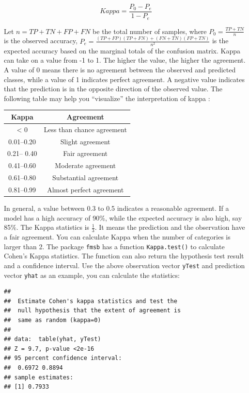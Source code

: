\documentclass[12pt,]{krantz}
\makeatletter
\newenvironment{Shaded}{\begin{snugshade}}{\end{snugshade}}
\newcommand{\CommentTok}[1]{\textcolor[rgb]{0.37,0.37,0.37}{\textit{#1}}}
\newcommand{\KeywordTok}[1]{\textcolor[rgb]{0.27,0.27,0.27}{\textbf{#1}}}
\newcommand{\NormalTok}[1]{#1}
\newcommand{\OperatorTok}[1]{\textcolor[rgb]{0.43,0.43,0.43}{\textbf{#1}}}
\newenvironment{kframe}{%
\medskip{}
\setlength{\fboxsep}{.8em}
 \def\at@end@of@kframe{}%
 \ifinner\ifhmode%
  \def\at@end@of@kframe{\end{minipage}}%
  \begin{minipage}{\columnwidth}%
 \fi\fi%
 \def\FrameCommand##1{\hskip\@totalleftmargin \hskip-\fboxsep
 \colorbox{shadecolor}{##1}\hskip-\fboxsep
     \hskip-\linewidth \hskip-\@totalleftmargin \hskip\columnwidth}%
 \MakeFramed {\advance\hsize-\width
   \@totalleftmargin\z@ \linewidth\hsize
   \@setminipage}}%
 {\par\unskip\endMakeFramed%
 \at@end@of@kframe}
\renewenvironment{Shaded}{\begin{kframe}}{\end{kframe}}
\makeatother
\begin{document}
\[Kappa=\frac{P_{0}-P_{e}}{1-P_{e}}\]

Let \(n=TP+TN+FP+FN\) be the total number of samples, where \(P_{0}=\frac{TP+TN}{n}\) is the observed accuracy, \(P_{e}=\frac{(TP+FP)(TP+FN)+(FN+TN)(FP+TN)}{n^{2}}\) is the expected accuracy based on the marginal totals of the confusion matrix. Kappa can take on a value from -1 to 1. The higher the value, the higher the agreement. A value of 0 means there is no agreement between the observed and predicted classes, while a value of 1 indicates perfect agreement. A negative value indicates that the prediction is in the opposite direction of the observed value. The following table may help you ``visualize'' the interpretation of kappa \citep{landis1977}:

\begin{longtable}[]{@{}cc@{}}
\toprule
Kappa & Agreement\tabularnewline
\midrule
\endhead
\textless{} 0 & Less than chance agreement\tabularnewline
0.01--0.20 & Slight agreement\tabularnewline
0.21-- 0.40 & Fair agreement\tabularnewline
0.41--0.60 & Moderate agreement\tabularnewline
0.61--0.80 & Substantial agreement\tabularnewline
0.81--0.99 & Almost perfect agreement\tabularnewline
\bottomrule
\end{longtable}

In general, a value between 0.3 to 0.5 indicates a reasonable agreement. If a model has a high accuracy of 90\%, while the expected accuracy is also high, say 85\%. The Kappa statistics is \(\frac{1}{3}\). It means the prediction and the observation have a fair agreement. You can calculate Kappa when the number of categories is larger than 2. The package \texttt{fmsb} has a function \texttt{Kappa.test()} to calculate Cohen's Kappa statistics. The function can also return the hypothesis test result and a confidence interval. Use the above observation vector \texttt{yTest} and prediction vector \texttt{yhat} as an example, you can calculate the statistics:

\begin{Shaded}
\end{Shaded}

\begin{verbatim}
## 
## 	Estimate Cohen's kappa statistics and test the
## 	null hypothesis that the extent of agreement is
## 	same as random (kappa=0)
## 
## data:  table(yhat, yTest)
## Z = 9.7, p-value <2e-16
## 95 percent confidence interval:
##  0.6972 0.8894
## sample estimates:
## [1] 0.7933
\end{verbatim}
\end{document}
